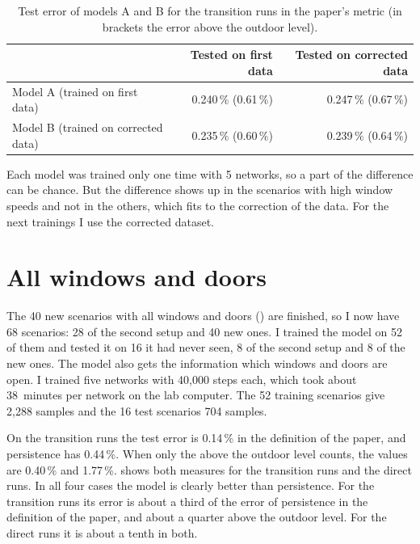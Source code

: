 \begin{table}[h]
  \centering
  \caption[Models A and B, transition runs.]{Test error of models A and B for the transition runs in the paper's
  metric (in brackets the error above the outdoor level).}
  \label{tab:abtr}
  \begin{tabular}{lrr}
    \toprule
     & Tested on first data & Tested on corrected data\\
    \midrule
    Model A (trained on first data) & 0.240\,\% (0.61\,\%) & 0.247\,\% (0.67\,\%)\\
    Model B (trained on corrected data) & 0.235\,\% (0.60\,\%) & 0.239\,\% (0.64\,\%)\\
    \bottomrule
  \end{tabular}
\end{table}

Each model was trained only one time with 5 networks, so a part of the difference can be chance. But the
difference shows up in the scenarios with high window speeds and not in the others, which fits to the
correction of the data. For the next trainings I use the corrected dataset.

\section{All windows and doors}
The 40 new scenarios with all windows and doors () are finished, so I now have 68 scenarios:
28 of the second setup and 40 new ones. I trained the model on 52 of them and tested it on 16 it had never seen,
8 of the second setup and 8 of the new ones. The model also gets the information which windows and doors are
open. I trained five networks with 40,000 steps each, which took about 38~minutes per network on the lab
computer. The 52 training scenarios give 2,288 samples and the 16 test scenarios 704 samples.

On the transition runs the test error is 0.14\,\% in the definition of the paper, and persistence has 0.44\,\%.
When only the \cotwo{} above the outdoor level counts, the values are 0.40\,\% and 1.77\,\%.  shows
both measures for the transition runs and the direct runs. In all four cases the model is clearly better than
persistence. For the transition runs its error is about a third of the error of persistence in the definition
of the paper, and about a quarter above the outdoor level. For the direct runs it is about a tenth in both.


